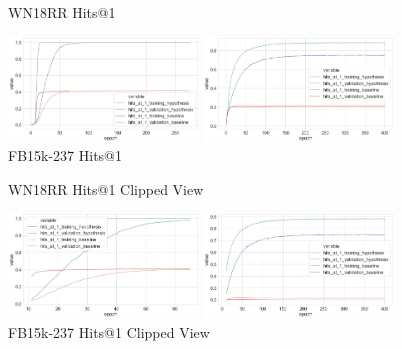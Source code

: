 \begin{figure}[H]
	\parbox{.5\linewidth}{
   		\caption{WN18RR Hits@1}
   		\centering
    		\includegraphics[width=0.45\textwidth, height=0.2\textheight]{WN18RR_hits_at_1_Results}
		}
	\hfill
	\parbox{.5\linewidth}{
		\caption{FB15k-237 Hits@1}
   		\centering
		\includegraphics[width=0.45\textwidth, height=0.2\textheight]{FB15k-237_hits_at_1_Results}
		}
\end{figure}

\begin{figure}[H]
	\parbox{.5\linewidth}{
   		\caption{WN18RR Hits@1 Clipped View}
   		\centering
    		\includegraphics[width=0.45\textwidth, height=0.2\textheight]{WN18RR_hits_at_1_Results_Clipped}
		}
	\hfill
	\parbox{.5\linewidth}{
		\caption{FB15k-237 Hits@1  Clipped View}
   		\centering
		\includegraphics[width=0.45\textwidth, height=0.2\textheight]{FB15k-237_hits_at_1_Results_Clipped}
		}
\end{figure}


